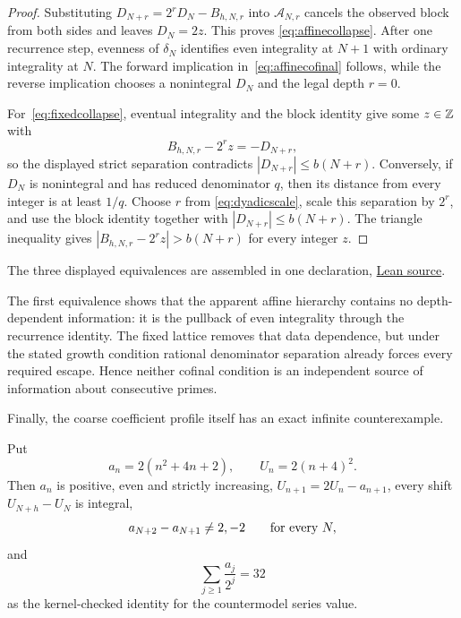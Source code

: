 \documentclass[11pt]{article}
\begin{document}
\begin{proof}
Substituting $D_{N+r}=2^rD_N-B_{h,N,r}$ into $\mathcal A_{N,r}$ cancels the
observed block from both sides and leaves $D_N=2z$.  This proves
\eqref{eq:affinecollapse}.  After one recurrence step, evenness of
$\delta_N$ identifies even integrality at $N+1$ with ordinary integrality at
$N$.  The forward implication in~\eqref{eq:affinecofinal} follows, while the
reverse implication chooses a nonintegral $D_N$ and the legal depth $r=0$.

For~\eqref{eq:fixedcollapse}, eventual integrality and the block identity give
some $z\in\mathbb{Z}$ with
\[
 B_{h,N,r}-2^rz=-D_{N+r},
\]
so the displayed strict separation contradicts $|D_{N+r}|\le b(N+r)$.
Conversely, if $D_N$ is nonintegral and has reduced denominator $q$, then its
distance from every integer is at least $1/q$.  Choose $r$ from
\eqref{eq:dyadicscale}, scale this separation by $2^r$, and use the block
identity together with $|D_{N+r}|\le b(N+r)$.  The triangle inequality gives
$|B_{h,N,r}-2^rz|>b(N+r)$ for every integer $z$.
\end{proof}

\noindent The three displayed equivalences are assembled in one declaration,
\href{https://github.com/wcook04/plectis-erdos/blob/f36a98bf3d3e6f65f1074e3b800e3293d5b8a51a/ErdosProblems/Erdos251/PaperCoreR7.lean#L241}{Lean source}.

The first equivalence shows that the apparent affine hierarchy contains no
depth-dependent information: it is the pullback of even integrality through
the recurrence identity.  The fixed lattice removes that data dependence, but
under the stated growth condition rational denominator separation already
forces every required escape.  Hence neither cofinal condition is an
independent source of information about consecutive primes.

Finally, the coarse coefficient profile itself has an exact infinite
counterexample.

\begin{proposition}\label{res:polynomialcountermodel}
Put
\[
 a_n=2(n^2+4n+2),\qquad U_n=2(n+4)^2.
\]
Then $a_n$ is positive, even and strictly increasing,
$U_{n+1}=2U_n-a_{n+1}$, every shift $U_{N+h}-U_N$ is integral,
\[
 a_{N+2}-a_{N+1}\ne2,-2
 \qquad\hbox{for every }N,
\]
and
\[
 \sum_{j\ge1}\frac{a_j}{2^j}=32
\]
as the kernel-checked identity for the countermodel series value.
\end{proposition}
\end{document}
